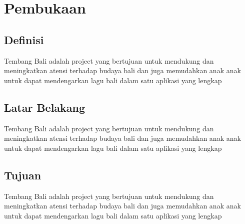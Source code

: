 \section{Pembukaan}

\subsection{Definisi}
Tembang Bali adalah project yang bertujuan untuk mendukung dan meningkatkan atensi terhadap budaya bali dan juga memudahkan 
anak anak untuk dapat mendengarkan lagu bali dalam satu aplikasi yang lengkap

\subsection{Latar Belakang}
Tembang Bali adalah project yang bertujuan untuk mendukung dan meningkatkan atensi terhadap budaya bali dan juga memudahkan 
anak anak untuk dapat mendengarkan lagu bali dalam satu aplikasi yang lengkap

\subsection{Tujuan}
Tembang Bali adalah project yang bertujuan untuk mendukung dan meningkatkan atensi terhadap budaya bali dan juga memudahkan 
anak anak untuk dapat mendengarkan lagu bali dalam satu aplikasi yang lengkap
